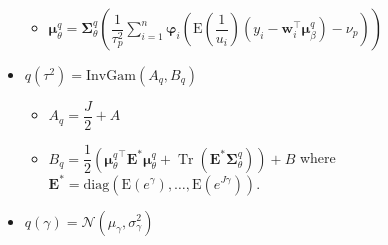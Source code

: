 \documentclass[12pt]{article}
\newcommand{\bs}{\boldsymbol}
\DeclareMathOperator{\Tr}{Tr}
\begin{document}
\begin{itemize}
\begin{itemize}
    \item $\bs{\mu}_{\theta}^{q} = \bs{\Sigma}_{\theta}^{q}\left(\dfrac{1}{\tau_{p}^{2}}\displaystyle\sum_{i=1}^{n}\bs{\varphi}_{i}\left(\mathrm{E}\left(\dfrac{1}{u_{i}}\right)\left(y_{i}-\bs{w}_{i}^{\top}\bs{\mu}_{\beta}^{q}\right)-\nu_{p}\right)\right)$
  \end{itemize}
  \item $q\left(\tau^{2}\right) = \mathrm{InvGam}\left(A_{q},B_{q}\right)$
  \begin{itemize}
    \item $A_{q}=\dfrac{J}{2}+A$
    \item $B_{q}=\dfrac{1}{2}\left({\bs{\mu}_{\theta}^{q}}^{\top}\bs{E}^{*}\bs{\mu}_{\theta}^{q}+\Tr\left(\bs{E}^{*}\bs{\Sigma}_{\theta}^{q}\right)\right)+B$ where $\bs{E}^{*}=\mathrm{diag}\left(\mathrm{E}\left(e^{\gamma}\right),\ldots,\mathrm{E}\left(e^{J\gamma}\right)\right)$.
  \end{itemize}
  \item $q\left(\gamma\right) = \mathcal{N}\left(\mu_{\gamma},\sigma_{\gamma}^{2}\right)$
\end{itemize}
\end{document}
